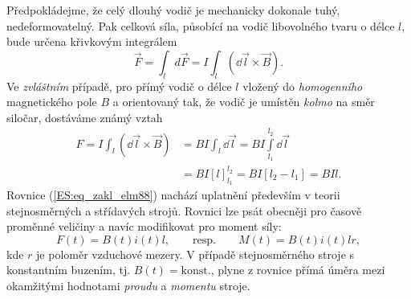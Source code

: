       Předpokládejme, že celý dlouhý vodič je mechanicky dokonale tuhý, nedeformovatelný. Pak 
      celková síla, působící na vodič libovolného tvaru o délce \(l\), bude určena křivkovým 
      integrálem
      \begin{equation}\label{ES:eq_zakl_elm87}
        \vec{F} = \int_ld\vec{F} 
                = I\int_l (\dd{\vec{l}}\times\vec{B}).
      \end{equation}
      Ve \emph{zvláštním} případě, pro přímý vodič o délce \(l\) vložený do \emph{homogenního} 
      magnetického pole \(B\) a orientovaný tak, že vodič je umístěn \emph{kolmo} na směr siločar, 
      dostáváme známý vztah
      \begin{align}\label{ES:eq_zakl_elm88}
        F  =  I\int_l (\dd{\vec{l}}\times\vec{B})
          &= BI\int_l \dd{\vec{l}} = BI\int\limits_{l_1}^{l_2}\dd{\vec{l}}  \nonumber \\
          &= BI[l]_{l_1}^{l_2}
           = BI[l_2 - l_1]
           = BIl.
      \end{align}
      Rovnice (\ref{ES:eq_zakl_elm88}) nachází uplatnění především v teorii stejnosměrných a 
      střídavých strojů. Rovnici lze psát obecněji pro časově proměnné veličiny a navíc modifikovat 
      pro moment síly:
      \begin{equation}\label{ES:eq_zakl_elm89}
        F(t)=B(t)i(t)l, \qquad\text{resp.} \qquad M(t)=B(t)i(t)lr,
      \end{equation}
      kde \(r\) je poloměr vzduchové mezery. V případě stejnosměrného stroje s konstantním buzením, 
      tj. \(B(t) = \text{konst.}\), plyne z rovnice přímá úměra mezi okamžitými hodnotami 
      \emph{proudu} a \emph{momentu} stroje.


